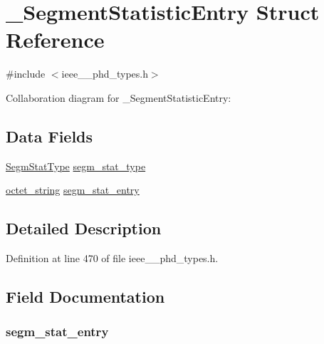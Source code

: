 \hypertarget{struct___segment_statistic_entry}{}\section{\+\_\+\+Segment\+Statistic\+Entry Struct Reference}
\label{struct___segment_statistic_entry}


{\ttfamily \#include $<$ieee\+\_\+\_\+phd\+\_\+types.\+h$>$}



Collaboration diagram for \+\_\+\+Segment\+Statistic\+Entry\+:
\subsection*{Data Fields}
\begin{DoxyCompactItemize}
\item 
\hyperlink{ieee__11073__phd__types_8h_ad89737fbf1c7aa6e11dd5c9a3c9879a7}{Segm\+Stat\+Type} \hyperlink{struct___segment_statistic_entry_ab657117d49724d0e6efec804506a7b5d}{segm\+\_\+stat\+\_\+type}
\item 
\hyperlink{ieee__11073__phd__types_8h_a5524261dd425fc0bd90c9d87277b7127}{octet\+\_\+string} \hyperlink{struct___segment_statistic_entry_a290ec1d0e31c56909f6d9f519876eb4d}{segm\+\_\+stat\+\_\+entry}
\end{DoxyCompactItemize}


\subsection{Detailed Description}


Definition at line 470 of file ieee\+\_\+\_\+phd\+\_\+types.\+h.



\subsection{Field Documentation}
\hypertarget{struct___segment_statistic_entry_a290ec1d0e31c56909f6d9f519876eb4d}{}
\subsubsection[{segm\+\_\+stat\+\_\+entry}]{ segm\+\_\+stat\+\_\+entry}\label{struct___segment_statistic_entry_a290ec1d0e31c56909f6d9f519876eb4d}



